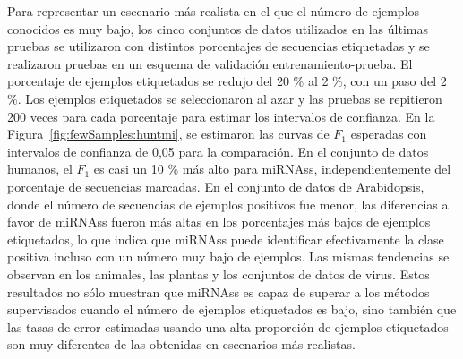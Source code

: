 Para representar un escenario más realista en el que el número de ejemplos conocidos es muy bajo, los cinco conjuntos de datos utilizados en las últimas pruebas
se utilizaron con distintos porcentajes de secuencias etiquetadas y se realizaron pruebas en un esquema de validación entrenamiento-prueba. El porcentaje de
ejemplos etiquetados se redujo del 20 \% al 2 \%, con un paso del 2 \%. Los ejemplos etiquetados se seleccionaron al azar y las pruebas se repitieron 200 veces
para cada porcentaje para estimar los intervalos de confianza. En la Figura~\ref{fig:fewSamples:huntmi}, se estimaron las curvas de $F_{1}$ esperadas con
intervalos de confianza de 0,05 para la comparación. En el conjunto de datos humanos, el $F_{1}$ es casi un 10 \% más alto para miRNAss, independientemente del
porcentaje de secuencias marcadas. En el conjunto de datos de Arabidopsis, donde el número de secuencias de ejemplos positivos fue menor, las diferencias a
favor de miRNAss fueron más altas en los porcentajes más bajos de ejemplos etiquetados, lo que indica que miRNAss puede identificar efectivamente la clase
positiva incluso con un número muy bajo de ejemplos. Las mismas tendencias se observan en los animales, las plantas y los conjuntos de datos de virus. Estos
resultados no sólo muestran que miRNAss es capaz de superar a los métodos supervisados cuando el número de ejemplos etiquetados es bajo, sino también que las
tasas de error estimadas usando una alta proporción de ejemplos etiquetados son muy diferentes de las obtenidas en escenarios más realistas.

